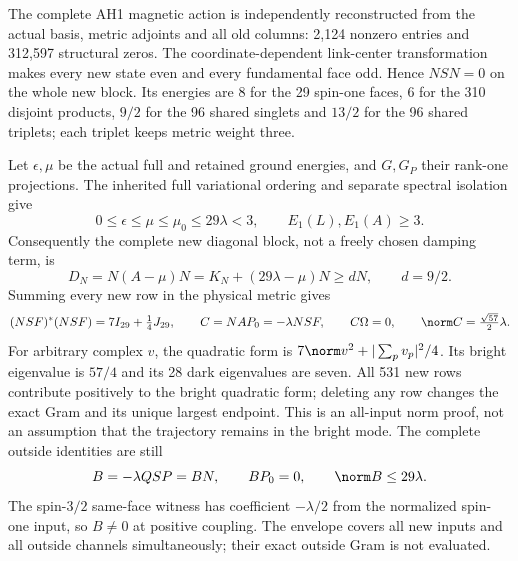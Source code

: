 The complete AH1 magnetic action is independently reconstructed from the actual basis, metric adjoints and all old columns: 2,124 nonzero entries and 312,597 structural zeros. The coordinate-dependent link-center transformation makes every new state even and every fundamental face odd. Hence $NSN=0$ on the whole new block. Its energies are $8$ for the 29 spin-one faces, $6$ for the 310 disjoint products, $9/2$ for the 96 shared singlets and $13/2$ for the 96 shared triplets; each triplet keeps metric weight three.

Let $\epsilon,\mu$ be the actual full and retained ground energies, and $G,G_P$ their rank-one projections. The inherited full variational ordering and separate spectral isolation give
\begin{equation}
 0\le\epsilon\le\mu\le\mu_0\le29\lambda<3,
 \qquad E_1(L),E_1(A)\ge3.
\end{equation}
Consequently the complete new diagonal block, not a freely chosen damping term, is
\begin{equation}
 D_N=N(A-\mu)N=K_N+(29\lambda-\mu)N\ge dN,
 \qquad d=9/2.
 \label{r28:eq:ah2-damping}
\end{equation}
Summing every new row in the physical metric gives
\begin{equation}
 (NSF)^*(NSF)=7I_{29}+\tfrac14J_{29},\qquad
 C=NAP_0=-\lambda NSF,\qquad C\Omega=0,
 \qquad\norm C=\tfrac{\sqrt{57}}2\lambda.
 \label{r28:eq:ah2-full-gram}
\end{equation}
For arbitrary complex $v$, the quadratic form is $7\norm v^2+|\sum_pv_p|^2/4$. Its bright eigenvalue is $57/4$ and its 28 dark eigenvalues are seven. All 531 new rows contribute positively to the bright quadratic form; deleting any row changes the exact Gram and its unique largest endpoint. This is an all-input norm proof, not an assumption that the trajectory remains in the bright mode. The complete outside identities are still
\begin{equation}
 B=-\lambda QSP=BN,\qquad BP_0=0,\qquad\norm B\le29\lambda.
\end{equation}
The spin-$3/2$ same-face witness has coefficient $-\lambda/2$ from the normalized spin-one input, so $B\ne0$ at positive coupling. The envelope covers all new inputs and all outside channels simultaneously; their exact outside Gram is not evaluated.

